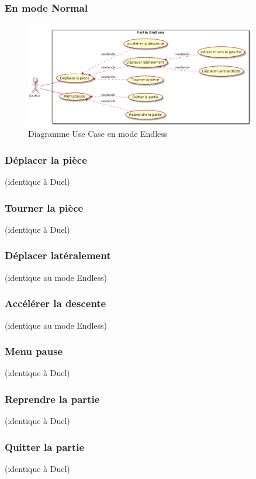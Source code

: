 \documentclass{article}
\begin{document}
\subsubsection{En mode Normal}

\begin{figure}[!h]
    \centering
    \includegraphics[width=0.9\textwidth]{./uml/usescase/en-jeu/endless.png}
    \caption{Diagramme Use Case en mode Endless}
    \label{fig:Endless}
\end{figure}

\subsubsection*{Déplacer la pièce} (identique à Duel)
\subsubsection*{Tourner la pièce} (identique à Duel)

\subsubsection*{Déplacer latéralement} (identique au mode Endless)

\subsubsection*{Accélérer la descente} (identique au mode Endless)

\subsubsection*{Menu pause} (identique à Duel)
\subsubsection*{Reprendre la partie} (identique à Duel)
\subsubsection*{Quitter la partie} (identique à Duel)
\end{document}
